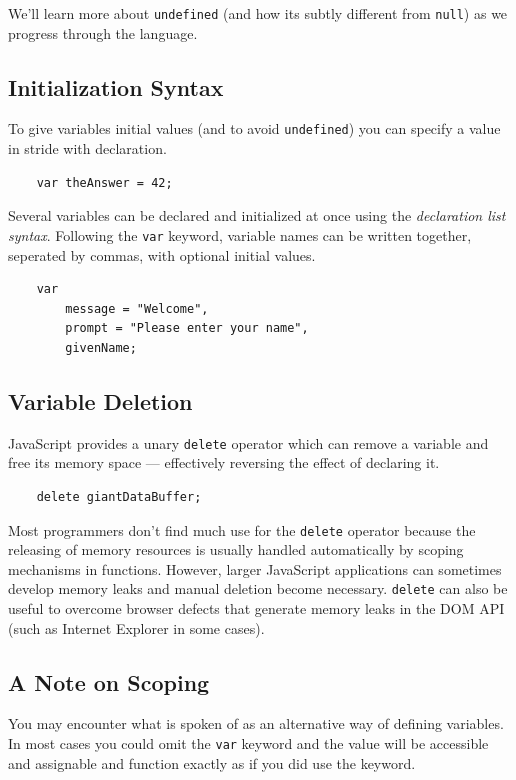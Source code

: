 \documentclass[11pt,letter]{book}
\begin{document}
    We'll learn more about \texttt{undefined} (and how its subtly different from \texttt{null}) as 
    we progress through the language.
    
    \subsection{Initialization Syntax}
    To give variables initial values (and to avoid \texttt{undefined}) you can specify a value in 
    stride with declaration.
    
    \begin{verbatim}
    var theAnswer = 42;
    \end{verbatim}
    
    Several variables can be declared and initialized at once using the \emph{declaration list 
    syntax}. Following the \texttt{var} keyword, variable names can be written together, seperated 
    by commas, with optional initial values.
    
    \begin{verbatim}
    var 
        message = "Welcome",
        prompt = "Please enter your name",
        givenName;
    \end{verbatim}
    
    \subsection{Variable Deletion}
    JavaScript provides a unary \texttt{delete} operator which can remove a variable and free its 
    memory space --- effectively reversing the effect of declaring it.
    
    \begin{verbatim}
    delete giantDataBuffer;
    \end{verbatim}
    
    Most programmers don't find much use for the \texttt{delete} operator because the releasing of 
    memory resources is usually handled automatically by scoping mechanisms in functions. However, 
    larger JavaScript applications can sometimes develop memory leaks and manual deletion become 
    necessary. \texttt{delete} can also be useful to overcome browser defects that generate memory 
    leaks in the DOM API (such as Internet Explorer in some cases).
    
    \subsection{A Note on Scoping}
    You may encounter what is spoken of as an alternative way of defining variables. In most cases
    you could omit the \texttt{var} keyword and the value will be accessible and assignable and 
    function exactly as if you did use the keyword.
    
\end{document}

